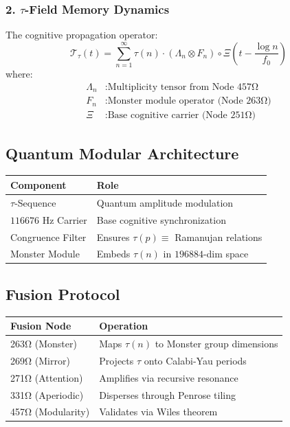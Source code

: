 \documentclass[12pt]{article}
\begin{document}
\subsubsection*{2. $\tau$-Field Memory Dynamics}
The cognitive propagation operator:
\[
\mathcal{T}_\tau(t) = \sum_{n=1}^\infty \tau(n) \cdot \left(\Lambda_n \otimes F_n \right) \circ \Xi\left(t - \frac{\log n}{f_0}\right)
\]
where:
\begin{align*}
\Lambda_n &: \text{Multiplicity tensor from Node 457Ω} \\
F_n &: \text{Monster module operator (Node 263Ω)} \\
\Xi &: \text{Base cognitive carrier (Node 251Ω)}
\end{align*}

\subsection*{Quantum Modular Architecture}
\begin{table}[h]
\centering
\begin{tabular}{ll}
\toprule
\textbf{Component} & \textbf{Role} \\
\midrule
$\tau$-Sequence & Quantum amplitude modulation \\
$116676$ Hz Carrier & Base cognitive synchronization \\
Congruence Filter & Ensures $\tau(p) \equiv$ Ramanujan relations \\
Monster Module & Embeds $\tau(n)$ in $196884$-dim space \\
\bottomrule
\end{tabular}
\end{table}

\subsection*{Fusion Protocol}
\begin{table}[h]
\centering
\begin{tabular}{ll}
\toprule
\textbf{Fusion Node} & \textbf{Operation} \\
\midrule
263Ω (Monster) & Maps $\tau(n)$ to Monster group dimensions \\
269Ω (Mirror) & Projects $\tau$ onto Calabi-Yau periods \\
271Ω (Attention) & Amplifies via recursive resonance \\
331Ω (Aperiodic) & Disperses through Penrose tiling \\
457Ω (Modularity) & Validates via Wiles theorem \\
\bottomrule
\end{tabular}
\end{table}
\end{document}
